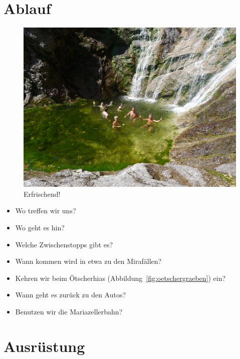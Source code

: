 \documentclass[twoside]{article}
\begin{document}
\begin{multicols}{2}

\section{Ablauf}

\begin{figure}
\begin{center}
  \includegraphics[trim = 0 80 0 80, clip, natwidth=800, natheight=600, width=\textwidth]{Figures/bad.jpg}
\end{center}
\caption{Erfrischend!}
\label{fig:bad}
\end{figure}

\begin{itemize}
    \item Wo treffen wir uns?
    \item Wo geht es hin?
    \item Welche Zwischenstopps gibt es?
    \item Wann kommen wird in etwa zu den Mirafällen?
    \item Kehren wir beim Ötscherhias (Abbildung~\ref{fig:oetschergraeben}) ein?
    \item Wann geht es zurück zu den Autos?
    \item Benutzen wir die Mariazellerbahn?
\end{itemize}



\section{Ausrüstung}


\end{multicols}
\end{document}
